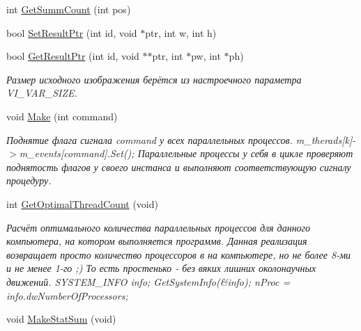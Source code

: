 \begin{DoxyCompactItemize}
\item 
int \hyperlink{class_c_v_i_engine_base_a354f23eda839e4aff3b578fc5ad50363}{Get\+Summ\+Count} (int pos)
\item 
bool \hyperlink{class_c_v_i_engine_base_a38d38d266d48fad44435eec46a1086a6}{Set\+Result\+Ptr} (int id, void $\ast$ptr, int w, int h)
\item 
bool \hyperlink{class_c_v_i_engine_base_a99f7df701bfe9d53121e5cd00167e591}{Get\+Result\+Ptr} (int id, void $\ast$$\ast$ptr, int $\ast$pw, int $\ast$ph)
\begin{DoxyCompactList}\small\item\em Размер исходного изображения берётся из настроечного параметра V\+I\+\_\+\+V\+A\+R\+\_\+\+S\+I\+Z\+E. \end{DoxyCompactList}\item 
void \hyperlink{class_c_v_i_engine_base_aa59b55fc315394f4c19cb7d95c399913}{Make} (int command)
\begin{DoxyCompactList}\small\item\em Поднятие флага сигнала command у всех параллельных процессов. m\+\_\+therads\mbox{[}k\mbox{]}-\/$>$m\+\_\+events\mbox{[}command\mbox{]}.Set(); Параллельные процессы у себя в цикле проверяют поднятость флагов у своего инстанса и выполняют соответствующую сигналу процедуру. \end{DoxyCompactList}\item 
int \hyperlink{class_c_v_i_engine_base_a1e0174d46d3d28931a648e0437f0686d}{Get\+Optimal\+Thread\+Count} (void)
\begin{DoxyCompactList}\small\item\em Расчёт оптимального количества параллельных процессов для данного компьютера, на котором выполняется программв. Данная реализация возвращает просто количество процессоров в на компьютере, но не более 8-\/ми и не менее 1-\/го ;) То есть простенько -\/ без вяких лишних околонаучных движений. S\+Y\+S\+T\+E\+M\+\_\+\+I\+N\+F\+O info; Get\+System\+Info(\&info); n\+Proc = info.\+dw\+Number\+Of\+Processors; \end{DoxyCompactList}\item 
void \hyperlink{class_c_v_i_engine_base_a2b86bf7f377f62e7a701fb3466708d04}{Make\+Stat\+Sum} (void)
$$
\end{DoxyCompactItemize}
